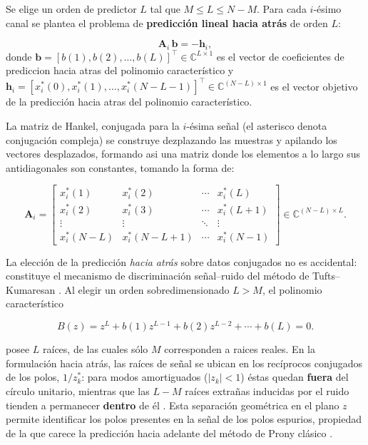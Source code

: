Se elige un orden de predictor $L$ tal que $M \le L \le N-M$. Para cada  $i$-ésimo canal se 
plantea el problema de \textbf{predicción lineal hacia atrás} de orden $L$:

\begin{equation}
\mathbf{A}_i\,\mathbf{b} = -\mathbf{h}_i,
\label{eq:backward_pred}
\end{equation}
donde $\mathbf{b}=[b(1),b(2),\dots,b(L)]^\top \in \mathbb{C}^{L \times 1} $ es el vector de 
coeficientes de prediccion hacia atras del polinomio característico y 
$\mathbf{h}_i = [x_i^*(0),x_i^*(1),\dots,x_i^*(N-L-1)]^\top \in \mathbb{C}^{(N-L)\times 1}$ es
el vector objetivo de la predicción hacia atras del polinomio característico.


La matriz de Hankel,  conjugada para la $i$-ésima señal (el asterisco denota
conjugación compleja) se construye dezplazando las muestras y apilando 
los vectores desplazados, formando asi una matriz donde los elementos a lo largo 
sus antidiagonales son constantes, tomando la forma de:

\begin{equation}
\mathbf{A}_i =
\begin{bmatrix}
x_i^*(1)   & x_i^*(2)   & \cdots & x_i^*(L) \\
x_i^*(2)   & x_i^*(3)   & \cdots & x_i^*(L+1) \\
\vdots     & \vdots     & \ddots & \vdots   \\
x_i^*(N-L) & x_i^*(N-L+1) & \cdots & x_i^*(N-1)
\end{bmatrix}
\in \mathbb{C}^{(N-L)\times L}.
\label{eq:Ai}
\end{equation}


La elección de la predicción \textit{hacia atrás} sobre datos conjugados
no es accidental: constituye el mecanismo de discriminación señal--ruido
del método de Tufts--Kumaresan \cite{Tufts1982}. Al elegir un orden
sobredimensionado $L > M$, el polinomio característico

\begin{equation}
    B(z) = z^L + b(1)z^{L-1} + b(2)z^{L-2} + \cdots + b(L) = 0.
    \label{eq:charpoly}
\end{equation}

posee $L$ raíces, de las cuales sólo $M$ corresponden a raices reales. En
la formulación hacia atrás, las raíces de señal se ubican en los
recíprocos conjugados de los polos, $1/z_k^*$: para modos amortiguados
($|z_k|<1$) éstas quedan \textbf{fuera} del círculo unitario, mientras que
las $L-M$ raíces extrañas inducidas por el ruido tienden a permanecer
\textbf{dentro} de él \cite{Tufts1982,Marple}. Esta separación geométrica en el
plano $z$ permite identificar los polos presentes en la señal de los polos espurios, 
propiedad de la que carece la predicción hacia adelante del método de Prony clásico
\cite{sauer2017,hauer1990}.

